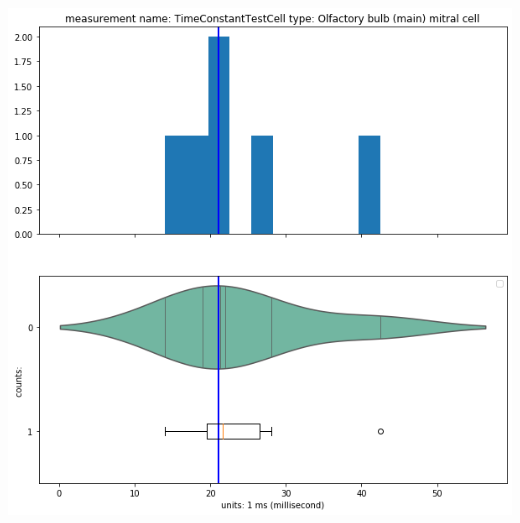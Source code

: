    \begin{center}
     \includegraphics[width=0.7\linewidth]{notebooks_converted/needata_thesis_files/needata_thesis_5_23}
    \end{center}
    { \hspace*{\fill} \\}
    
    


    
    
